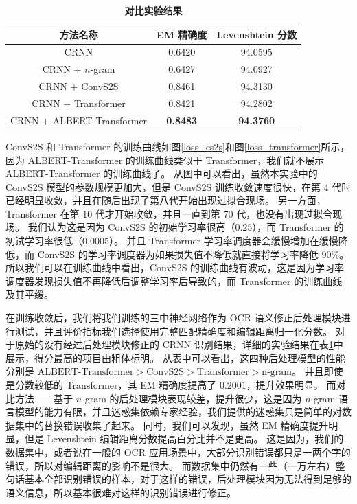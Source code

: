 \begin{table}[!hpt]
	\caption[]{\textbf{对比实验结果}}
	\label{tab:result}
	\centering
	\begin{tabular}{c c c}
		\hline
		\textbf{方法名称} & \textbf{EM 精确度} & \textbf{Levenshtein 分数} \\
		\hline
		CRNN & 0.6420 & 94.0595 \\
		CRNN + $n$-gram & 0.6427 & 94.0927 \\
		CRNN + ConvS2S & 0.8461 & 94.3130 \\
		CRNN + Transformer & 0.8421 & 94.2802 \\
		CRNN + ALBERT-Transformer & \textbf{0.8483} & \textbf{94.3760} \\
		\hline
	\end{tabular}
\end{table}

ConvS2S 和 Transformer 的训练曲线如图\ref{loss_cs2s}和图\ref{loss_transformer}所示，因为 ALBERT-Transformer 的训练曲线类似于 Transformer，我们就不展示 ALBERT-Transformer 的训练曲线了。
从图中可以看出，虽然本实验中的 ConvS2S 模型的参数规模更加大，但是 ConvS2S 训练收敛速度很快，在第 4 代时已经明显收敛，并且在随后出现了第八代开始出现过拟合现场。
另一方面，Transformer 在第 10 代才开始收敛，并且一直到第 70 代，也没有出现过拟合现场。
我们认为这是因为 ConvS2S 的初始学习率很高（$0.25$），而 Transformer 的初试学习率很低（$0.0005$）。
并且 Transformer 学习率调度器会缓慢增加在缓慢降低，而 ConvS2S 的学习率调度器为如果损失值不降低就直接将学习率降低 $90\%$。
所以我们可以在训练曲线中看出，ConvS2S 的训练曲线有波动，这是因为学习率调度器发现损失值不再降低后调整学习率后导致的，而 Transformer 的训练曲线及其平缓。

在训练收敛后，我们将我们训练的三中神经网络作为 OCR 语义修正后处理模块进行测试，并且评价指标我们选择使用完整匹配精确度和编辑距离归一化分数。
对于原始的没有经过后处理模块修正的 CRNN 识别结果，详细的实验结果在表\ref{tab:result}中展示，得分最高的项目由粗体标明。
从表中可以看出，这四种后处理模型的性能分别是 $\text{ALBERT-Transformer} > \text{ConvS2S} > \text{Transformer} > \text{n-gram}$。
并且即使是分数较低的 Transformer，其 EM 精确度提高了 $0.2001$，提升效果明显。
而对比方法——基于 $n$-gram 的后处理模块表现较差，提升很少，这是因为 $n$-gram 语言模型的能力有限，并且迷惑集依赖专家经验，我们提供的迷惑集只是简单的对数据集中的替换错误收集了起来。
同时，我们可以发现，虽然 EM 精确度提升明显，但是 Levenshtein 编辑距离分数提高百分比并不是更高。
这是因为，我们的数据集中，或者说在一般的 OCR 应用场景中，大部分识别错误都只是一两个字的错误，所以对编辑距离的影响不是很大。
而数据集中仍然有一些（一万左右）整句话基本全部识别错误的样本，对于这样的错误，后处理模块因为无法得到足够的语义信息，所以基本很难对这样的识别错误进行修正。

